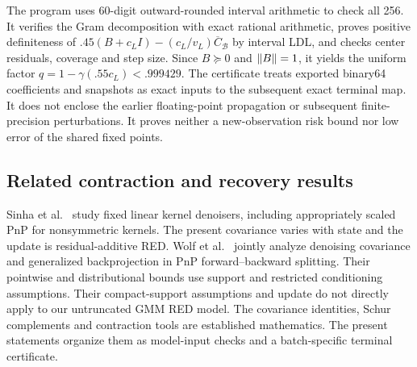 The program 
uses 60-digit outward-rounded interval arithmetic to check all 256.
It verifies the Gram decomposition with exact rational arithmetic,
proves positive definiteness of
$.45(B+c_LI)-(c_L/v_L)\overline C_{\mathcal B}$ by interval LDL,
and checks center residuals, coverage and step size.
Since $B\succeq0$ and $\lVert B\rVert=1$, it yields the uniform factor
$q=1-\gamma(.55c_L)<.999429$.
The certificate treats exported binary64 coefficients and snapshots
as exact inputs to the subsequent exact terminal map.
It does not enclose the earlier floating-point propagation or
subsequent finite-precision perturbations.
It proves neither a new-observation risk bound nor low error of the
shared fixed points.

\subsection{Related contraction and recovery results}
Sinha et al.~\cite{sinha2025} study fixed linear kernel denoisers,
including appropriately scaled PnP for nonsymmetric kernels.
The present covariance varies with state and the update is residual-additive RED.
Wolf et al.~\cite{wolf2026} jointly analyze denoising covariance
and generalized backprojection in PnP forward--backward splitting.
Their pointwise and distributional bounds use support and restricted
conditioning assumptions. Their compact-support assumptions and
update do not directly apply to our untruncated GMM RED model.
The covariance identities, Schur complements and contraction tools
are established mathematics. The present statements organize them
as model-input checks and a batch-specific terminal certificate.


